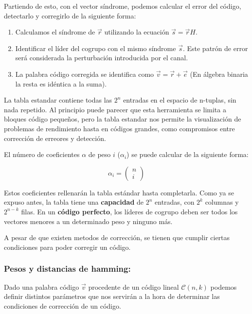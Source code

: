 \documentclass{article}
\begin{document}
Partiendo de esto, con el vector síndrome, podemos calcular el error del código, detectarlo y corregirlo de la siguiente forma:

\begin{enumerate}
    \item Calculamos el síndrome de $\vec{r}$ utilizando la ecuación $\vec{s} = \vec{r}H$.
    \item Identificar el líder del cogrupo con el mismo síndrome $\vec{s}$. Este patrón de error será considerada la perturbación introducida por el canal.
    \item La palabra código corregida se identifica como $\vec{v} = \vec{r} + \vec{e}$ (En álgebra binaria la resta es idéntica a la suma).
\end{enumerate}

La tabla estandar contiene todas las $2^n$ entradas en el espacio de n-tuplas, sin nada repetido. Al principio puede parecer que esta herramienta se limita a bloques código pequeños, pero la tabla estandar nos permite la visualización de problemas de rendimiento hasta en códigos grandes, como compromisos entre corrección de erreores y detección.

El número de coeficientes $\alpha$ de peso $i$ ($\alpha_i$) se puede calcular de la siguiente forma:

\begin{equation}
    \alpha_i =
    \left(
    \begin{array}{c}
       n\\
       i 
    \end{array}
    \right)
\end{equation}

Estos coeficientes rellenarán la tabla estándar hasta completarla. Como ya se expuso antes, la tabla tiene una \textbf{capacidad} de $2^n$ entradas, con $2^k$ columnas y $2^{n-k}$ filas. En un \textbf{código perfecto}, los líderes de cogrupo deben ser todos los vectores menores a un determinado peso y ninguno más.

A pesar de que existen metodos de corrección, se tienen que cumplir ciertas condiciones para poder corregir un código.

\subsubsection{Pesos y distancias de hamming:}

Dado una palabra código $\vec{v}$ procedente de un código lineal $\mathcal{C}(n,k)$ podemos definir distintos parámetros que nos servirán a la hora de determinar las condiciones de corrección de un código.
\end{document}
